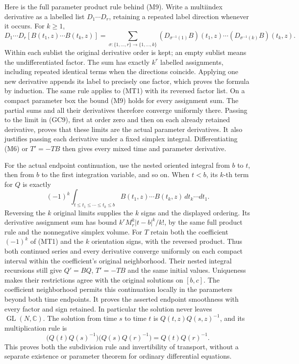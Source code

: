 \documentclass[
  11pt,
]{article}
\begin{document}
Here is the full parameter product rule behind (M9). Write a multiindex
derivative as a labelled list \(D_1\cdots D_r\), retaining a repeated
label direction whenever it occurs. For \(k\geq1\), \[
 D_1\cdots D_r[B(t_1,z)\cdots B(t_k,z)]
 =\sum_{\sigma:\{1,\ldots,r\}\to\{1,\ldots,k\}}
 (D_{\sigma^{-1}(1)}B)(t_1,z)\cdots
 (D_{\sigma^{-1}(k)}B)(t_k,z).
 \tag{MT2}
\] Within each sublist the original derivative order is kept; an empty
sublist means the undifferentiated factor. The sum has exactly \(k^r\)
labelled assignments, including repeated identical terms when the
directions coincide. Applying one new derivative appends its label to
precisely one factor, which proves the formula by induction. The same
rule applies to (MT1) with its reversed factor list. On a compact
parameter box the bound (M9) holds for every assignment sum. The partial
sums and all their derivatives therefore converge uniformly there.
Passing to the limit in (GC9), first at order zero and then on each
already retained derivative, proves that these limits are the actual
parameter derivatives. It also justifies passing each derivative under a
fixed simplex integral. Differentiating (M6) or \(T'=-TB\) then gives
every mixed time and parameter derivative.

For the actual endpoint continuation, use the nested oriented integral
from \(b\) to \(t\), then from \(b\) to the first integration variable,
and so on. When \(t<b\), its \(k\)-th term for \(Q\) is exactly \[
 (-1)^k\int_{t\leq t_1\leq\cdots\leq t_k\leq b}
 B(t_1,z)\cdots B(t_k,z)\,dt_k\cdots dt_1.
 \tag{MT3}
\] Reversing the \(k\) original limits supplies the \(k\) signs and the
displayed ordering. Its derivative assignment sum has bound
\(k^r M_r^k|t-b|^k/k!\), by the same full product rule and the
nonnegative simplex volume. For \(T\) retain both the coefficient
\((-1)^k\) of (MT1) and the \(k\) orientation signs, with the reversed
product. Thus both continued series and every derivative converge
uniformly on each compact interval within the coefficient's original
neighborhood. Their nested integral recursions still give \(Q'=BQ\),
\(T'=-TB\) and the same initial values. Uniqueness makes their
restrictions agree with the original solutions on \([b,c]\). The
coefficient neighborhood permits this continuation locally in the
parameters beyond both time endpoints. It proves the asserted endpoint
smoothness with every factor and sign retained. In particular the
solution never leaves \(\operatorname{GL}(N,\mathbb C)\). The solution
from time \(s\) to time \(t\) is \(Q(t,z)Q(s,z)^{-1}\), and its
multiplication rule is \[
\bigl(Q(t)Q(s)^{-1}\bigr)
\bigl(Q(s)Q(r)^{-1}\bigr)=Q(t)Q(r)^{-1}.
\tag{M12}
\] This proves both the subdivision rule and invertibility of transport,
without a separate existence or parameter theorem for ordinary
differential equations.
\end{document}
